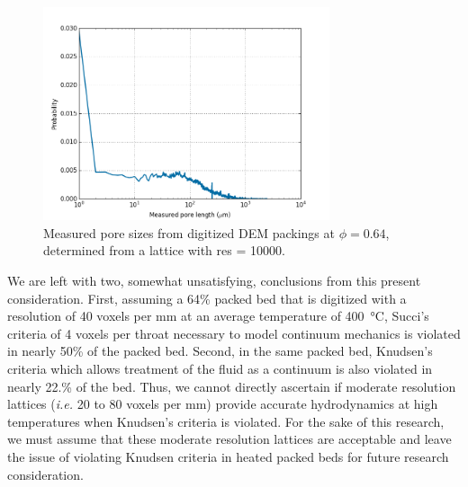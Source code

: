\begin{figure}[ht]
    \centering
    \includegraphics[width=0.75\textwidth]{figures/lbm/res10000-pore-size-distributions}
    \caption{Measured pore sizes from digitized DEM packings at $\phi = 0.64$, determined from a lattice with res = \num{10000}.}\label{fig:res10000-pore-size-distributions}
\end{figure}


We are left with two, somewhat unsatisfying, conclusions from this present consideration. First, assuming a 64\% packed bed that is digitized with a resolution of 40 voxels per mm at an average temperature of \SI{400}{\celsius}, Succi's criteria of 4 voxels per throat necessary to model continuum mechanics is violated in nearly 50\% of the packed bed. Second, in the same packed bed, Knudsen's criteria which allows treatment of the fluid as a continuum is also violated in nearly 22.\% of the bed. Thus, we cannot directly ascertain if moderate resolution lattices (\textit{i.e.} 20 to 80 voxels per mm) provide accurate hydrodynamics at high temperatures when Knudsen's criteria is violated. For the sake of this research, we must assume that these moderate resolution lattices are acceptable and leave the issue of violating Knudsen criteria in heated packed beds for future research consideration.



